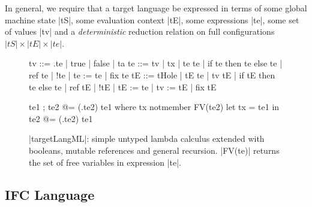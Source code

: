 In general, we require that a target language be expressed in terms
of some global machine state |tS|, some evaluation context |tE|,
some expressions |te|, some set of values |tv| and a \emph{deterministic}
reduction relation on full configurations $|tS| \times |tE| \times |te|$.

\begin{figure}
\begin{code}
tv   ::= \tx.te | true | false | ta
te   ::= tv | tx | te te | if te then te else te
       | ref te | !te | te := te | fix te
tE   ::= tHole | tE te | tv tE | if tE then te else te
       | ref tE | !tE | tE := te | tv := tE | fix tE

te1 ; te2            @= (\tx.te2) te1  where  tx notmember FV(te2)
let tx = te1 in te2  @= (\tx.te2) te1
\end{code}


\caption{|targetLangML|: simple untyped lambda calculus extended with booleans,
mutable references and general recursion. |FV(te)| returns the set of free
variables in expression |te|.}
\label{fig:ml}
\end{figure}

\subsection{IFC Language}

